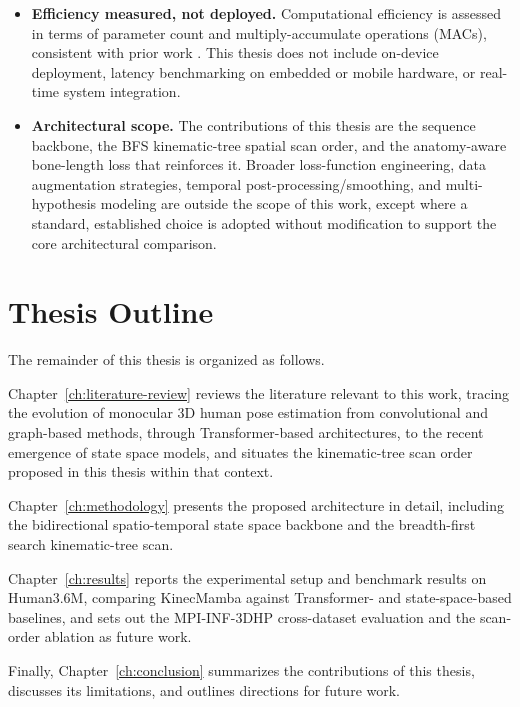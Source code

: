 \begin{itemize}
  \item \textbf{Efficiency measured, not deployed.} Computational
    efficiency is assessed in terms of parameter count and
    multiply-accumulate operations (MACs), consistent with prior work
    \cite{zhang2024posemagic, cui2025sasmamba}. This thesis does not
    include on-device deployment, latency benchmarking on embedded or
    mobile hardware, or real-time system integration.

  \item \textbf{Architectural scope.} The contributions of this thesis are
    the sequence backbone, the BFS kinematic-tree spatial scan order, and the
    anatomy-aware bone-length loss that reinforces it. Broader loss-function
    engineering, data augmentation strategies, temporal
    post-processing/smoothing, and multi-hypothesis modeling
    \cite{li2022mhformer} are outside the scope of this work, except where a
    standard, established choice is adopted without modification to support
    the core architectural comparison.
\end{itemize}

\section{Thesis Outline}
\label{sec:intro-outline}

The remainder of this thesis is organized as follows.

Chapter~\ref{ch:literature-review} reviews the literature relevant to this
work, tracing the evolution of monocular 3D human pose estimation from
convolutional and graph-based methods, through Transformer-based
architectures, to the recent emergence of state space models, and
situates the kinematic-tree scan order proposed in this thesis within that
context.

Chapter~\ref{ch:methodology} presents the proposed architecture in detail,
including the bidirectional spatio-temporal state space backbone and the
breadth-first search kinematic-tree scan.

Chapter~\ref{ch:results} reports the experimental setup and benchmark
results on Human3.6M, comparing KinecMamba against Transformer- and
state-space-based baselines, and sets out the MPI-INF-3DHP cross-dataset
evaluation and the scan-order ablation as future work.

Finally, Chapter~\ref{ch:conclusion} summarizes the contributions of this
thesis, discusses its limitations, and outlines directions for future
work.

\FloatBarrier

